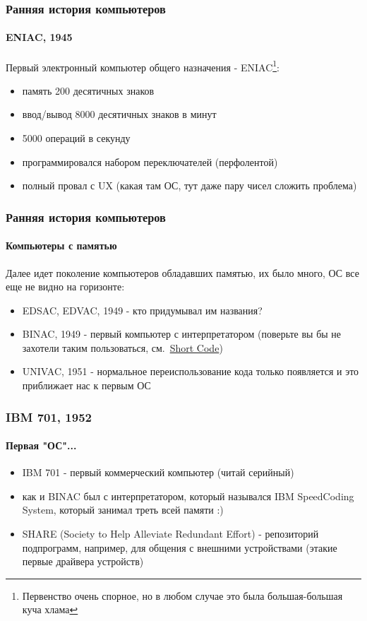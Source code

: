 \begin{frame}
\frametitle{Ранняя история компьютеров}
\framesubtitle{ENIAC, 1945}

Первый электронный компьютер общего назначения - ENIAC\footnote{Первенство очень
спорное, но в любом случае это была большая-большая куча хлама}:
\begin{itemize}
  \item память 200 десятичных знаков
  \item ввод/вывод 8000 десятичных знаков в минут
  \item 5000 операций в секунду
  \item программировался набором переключателей (перфолентой)
  \item полный провал с UX (какая там ОС, тут даже пару чисел сложить проблема)
\end{itemize}

\end{frame}

\begin{frame}
\frametitle{Ранняя история компьютеров}
\framesubtitle{Компьютеры с памятью}

Далее идет поколение компьютеров обладавших памятью, их было много, ОС все еще
не видно на горизонте:
\begin{itemize}
  \item EDSAC, EDVAC, 1949 - кто придумывал им названия?
  \item BINAC, 1949 - первый компьютер с интерпретатором (поверьте вы бы не
        захотели таким пользоваться, см.~\href{https://en.wikipedia.org/wiki/Short_Code_(computer_language)}{Short Code})
  \item UNIVAC, 1951 - нормальное переиспользование кода только появляется и
        это приближает нас к первым ОС
\end{itemize}

\end{frame}

\begin{frame}
\frametitle{IBM 701, 1952}
\framesubtitle{Первая "ОС"...}

\begin{itemize}
  \item IBM 701 - первый коммерческий компьютер (читай серийный)
  \item как и BINAC был с интерпретатором, который назывался IBM SpeedCoding
        System, который занимал треть всей памяти :)
  \item SHARE (Society to Help Alleviate Redundant Effort) - репозиторий
        подпрограмм, например, для общения с внешними устройствами (этакие
        первые драйвера устройств)
\end{itemize}

\end{frame}

